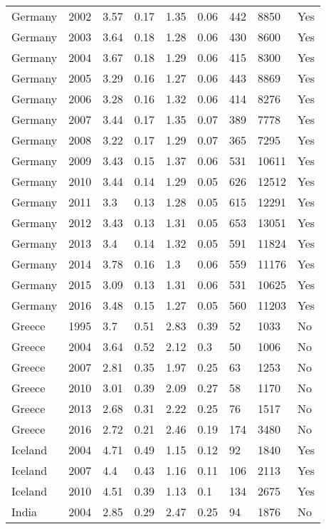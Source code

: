 \begin{tabular}{lllllllll}
Germany & 2002 & 3.57 & 0.17 & 1.35 & 0.06 & 442 & 8850 & Yes \\ 
Germany & 2003 & 3.64 & 0.18 & 1.28 & 0.06 & 430 & 8600 & Yes \\ 
Germany & 2004 & 3.67 & 0.18 & 1.29 & 0.06 & 415 & 8300 & Yes \\ 
Germany & 2005 & 3.29 & 0.16 & 1.27 & 0.06 & 443 & 8869 & Yes \\ 
Germany & 2006 & 3.28 & 0.16 & 1.32 & 0.06 & 414 & 8276 & Yes \\ 
Germany & 2007 & 3.44 & 0.17 & 1.35 & 0.07 & 389 & 7778 & Yes \\ 
Germany & 2008 & 3.22 & 0.17 & 1.29 & 0.07 & 365 & 7295 & Yes \\ 
Germany & 2009 & 3.43 & 0.15 & 1.37 & 0.06 & 531 & 10611 & Yes \\ 
Germany & 2010 & 3.44 & 0.14 & 1.29 & 0.05 & 626 & 12512 & Yes \\ 
Germany & 2011 & 3.3 & 0.13 & 1.28 & 0.05 & 615 & 12291 & Yes \\ 
Germany & 2012 & 3.43 & 0.13 & 1.31 & 0.05 & 653 & 13051 & Yes \\ 
Germany & 2013 & 3.4 & 0.14 & 1.32 & 0.05 & 591 & 11824 & Yes \\ 
Germany & 2014 & 3.78 & 0.16 & 1.3 & 0.06 & 559 & 11176 & Yes \\ 
Germany & 2015 & 3.09 & 0.13 & 1.31 & 0.06 & 531 & 10625 & Yes \\ 
Germany & 2016 & 3.48 & 0.15 & 1.27 & 0.05 & 560 & 11203 & Yes \\ 
Greece & 1995 & 3.7 & 0.51 & 2.83 & 0.39 & 52 & 1033 & No \\ 
Greece & 2004 & 3.64 & 0.52 & 2.12 & 0.3 & 50 & 1006 & No \\ 
Greece & 2007 & 2.81 & 0.35 & 1.97 & 0.25 & 63 & 1253 & No \\ 
Greece & 2010 & 3.01 & 0.39 & 2.09 & 0.27 & 58 & 1170 & No \\ 
Greece & 2013 & 2.68 & 0.31 & 2.22 & 0.25 & 76 & 1517 & No \\ 
Greece & 2016 & 2.72 & 0.21 & 2.46 & 0.19 & 174 & 3480 & No \\ 
Iceland & 2004 & 4.71 & 0.49 & 1.15 & 0.12 & 92 & 1840 & Yes \\ 
Iceland & 2007 & 4.4 & 0.43 & 1.16 & 0.11 & 106 & 2113 & Yes \\ 
Iceland & 2010 & 4.51 & 0.39 & 1.13 & 0.1 & 134 & 2675 & Yes \\ 
India & 2004 & 2.85 & 0.29 & 2.47 & 0.25 & 94 & 1876 & No \\ 

\end{tabular}

